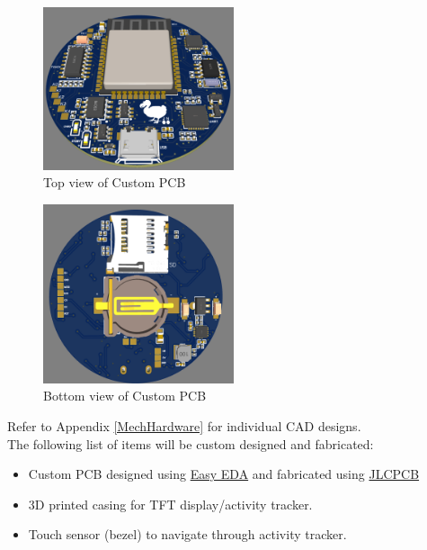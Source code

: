 \documentclass[12pt, titlepage]{article}
\begin{document}
\begin{figure}[H]
	\begin{center}
		 \includegraphics[width=0.5\textwidth]{PCBTOP}
		\caption{Top view of Custom PCB}
		\label{PCBTOP} 
	\end{center}
\end{figure}

\begin{figure}[H]
	\begin{center}
		 \includegraphics[width=0.5\textwidth]{PCBBOTTOM}
		\caption{Bottom view of Custom PCB}
		\label{PCBBOTTOM} 
	\end{center}
\end{figure}

Refer to Appendix \ref{MechHardware} for individual CAD designs.\\

The following list of items will be custom designed and fabricated:
\begin{itemize}
\item{Custom PCB designed using \href{https://easyeda.com/}{Easy EDA} and fabricated using \href{https://jlcpcb.com/}{JLCPCB}}
\item{3D printed casing for TFT display/activity tracker.}
\item{Touch sensor (bezel) to navigate through activity tracker.}
\end{itemize}
\end{document}
